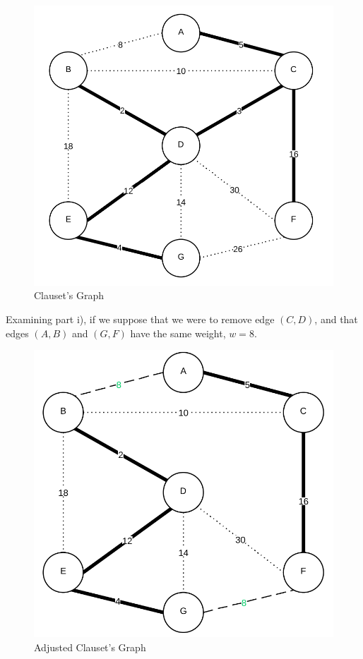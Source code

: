 \documentclass[10pt]{article}\usepackage[]{graphicx}\usepackage[]{xcolor}
\begin{document}
\begin{easylist}[enumerate]
    \begin{figure}[H]
        \centering
        \includegraphics[scale=0.5]{./img/ps8/3ca.png}
        \caption{Clauset's Graph}
        \label{fig:3bb}
    \end{figure}

    Examining part i), if we suppose that we were to remove edge $(C, D)$, and that edges $(A, B)$ and $(G, F)$ have the
    same weight, $w=8$.

    \begin{figure}[H]
        \centering
        \includegraphics[scale=0.5]{./img/ps8/3cb.png}
        \caption{Adjusted Clauset's Graph}
        \label{fig:3bb}
    \end{figure}


\end{easylist}
\end{document}
